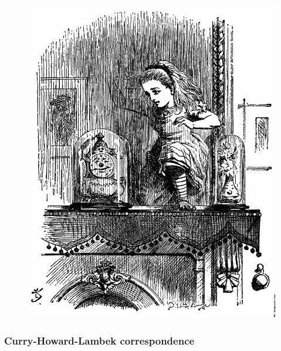 \documentclass[
  xcolor={usenames,dvipsnames,svgnames},
  ]{beamer}
\begin{document}
\begin{frame}
\begin{figure}
\begin{minipage}{.5\textwidth}
      \includegraphics[width=\textwidth]{graphics/013-Alice-emerging-from-the-looking-glass-q42-1725x2168.jpg}
    \end{minipage}

  \end{figure}
\end{frame}

\begin{frame}
  \frametitle{Curry-Howard-Lambek correspondence}
  \begin{center}
  \end{center}
\end{frame}
\end{document}
